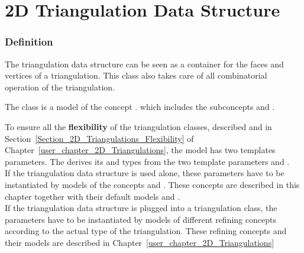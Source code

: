 

\chapter{2D Triangulation Data Structure}
\label{ref_chapter_2D_Triangulation_Data_Structure}

\subsection*{Definition}
The triangulation data structure can be seen as a container
for the faces and vertices of a triangulation. This class also takes care
of all combinatorial operation of the triangulation.

The class 
is  a model of the concept .
which includes the subconcepts
and .

To ensure all the \textbf{flexibility} of  the triangulation
classes, 
described 
and in Section~\ref{Section_2D_Triangulations_Flexibility}
of
Chapter~\ref{user_chapter_2D_Triangulations}, the  model 
has two templates parameters.
The 
\ccRefName derives its  and  types
from the two template parameters  and . \\
If the triangulation data structure
is used alone, these parameters 
have to be instantiated by models
of the concepts  and 
. These concepts
are described in this chapter together with their
default models 
and  . \\
If the triangulation data structure
is plugged into a triangulation class, the parameters
have to be instantiated by models of different 
refining concepts according to the actual type of the triangulation.
These refining concepts and their models
are described in Chapter~\ref{user_chapter_2D_Triangulations}


